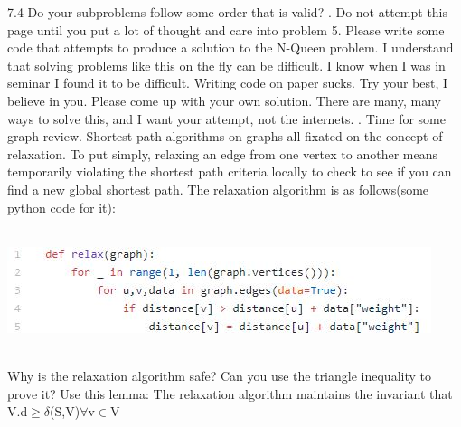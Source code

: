 \documentclass[12pt]{article}
\begin{document}
7.4 Do your subproblems follow some order that is valid?
\newpage
{}. Do not attempt this page until you put a 
lot of thought and care into problem 5. Please write
some code that attempts to produce a solution to the
N-Queen problem.
 I understand that solving problems like this on the 
 fly can be difficult. I know when I was in seminar 
 I found it to be difficult. Writing code on paper sucks.
  Try your best, I believe in you. Please come up with your
  own solution. There are many, many ways to solve this,
  and I want your attempt, not the internets.
\newpage
{}. Time for some graph review. Shortest path algorithms on graphs all fixated 
on the concept of relaxation. To put simply, relaxing an edge from
one vertex to another means temporarily violating the shortest path
criteria locally to check to see if you can find a new global shortest path.
The relaxation algorithm is as follows(some python code for it):\\\\
\centerline{\includegraphics{relax.jpg}}\\
Why is the relaxation algorithm safe? Can you use the triangle inequality to
 prove it? Use this lemma: The relaxation algorithm maintains the 
 invariant that V.d$ \geq \delta$(S,V)$ \forall $v$ \in $V\\\\\\\\
\end{document}
